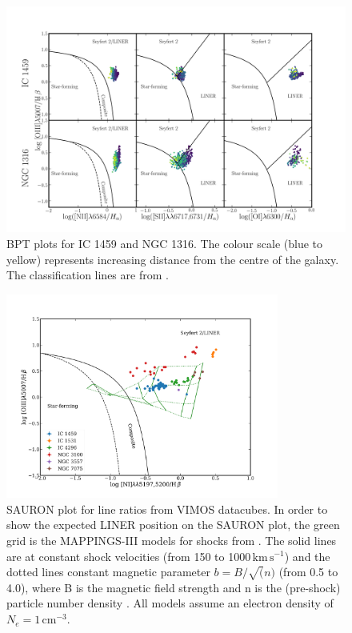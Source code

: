 		\begin{figure}
			\centering
			\includegraphics[width=\textwidth]{chapter5/BPT.png}
			\caption[BPT plots]{BPT plots for IC 1459 and NGC 1316. The colour scale (blue to yellow) represents increasing distance from the centre of the galaxy. The classification lines are from \citet{Kewley2006}.}
			\label{fig:BPT}
		\end{figure}

		\begin{figure}
			\centering
			\includegraphics[width=0.8\textwidth]{chapter5/SAURON.png}
			\caption[An alternative diagnostic plot]{SAURON plot for line ratios from VIMOS datacubes. In order to show the expected LINER position on the SAURON plot, the green grid is the MAPPINGS-III models for shocks from \citet{Allen2008}. The solid lines are at constant shock velocities (from 150 to 1000\,$\mathrm{km\,s^{-1}}$) and the dotted lines constant magnetic parameter $b = B/\sqrt(n)$ (from 0.5 to 4.0), where B is the magnetic field strength and n is the (pre-shock) particle number density \citep{Dopita1996}. All models assume an electron density of $N_e = 1\,\mathrm{cm^{-3}}$.}
			\label{fig:SAURON}
		\end{figure}

